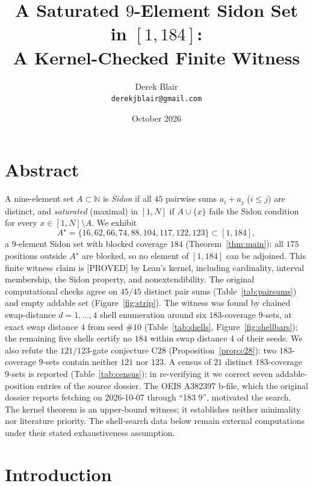 \documentclass[11pt,a4paper]{article}
\title{A Saturated $9$-Element Sidon Set in $[1,184]$:\\
  A Kernel-Checked Finite Witness}
\author{Derek Blair \\ \texttt{derekjblair@gmail.com}}
\date{October 2026}
\theoremstyle{definition}
\begin{document}
\maketitle

\section{Abstract}

A nine-element set $A\subset\mathbb{N}$ is \emph{Sidon} if all $45$ pairwise sums
$a_i+a_j$ ($i\le j$) are distinct, and \emph{saturated} (maximal) in
$[1,N]$ if $A\cup\{x\}$ fails the Sidon condition for every
$x\in[1,N]\setminus A$. We exhibit
\begin{equation}
  \label{eq:witness}
  A^\star=\{16,62,66,74,88,104,117,122,123\}\subset[1,184],
\end{equation}
a $9$-element Sidon set with blocked coverage $184$
(Theorem~\ref{thm:main}): all $175$ positions outside $A^\star$ are
blocked, so no element of $[1,184]$ can be adjoined. This finite witness
claim is [PROVED] by Lean's kernel, including cardinality, interval
membership, the Sidon property, and nonextendibility. The original
computational checks agree on $45/45$ distinct pair sums
(Table~\ref{tab:pairsums}) and empty addable set
(Figure~\ref{fig:strip}). The witness was found by chained
swap-distance $d=1,\dots,4$ shell enumeration around six $183$-coverage
$9$-sets, at exact swap distance $4$ from seed $\#10$
(Table~\ref{tab:shells}, Figure~\ref{fig:shellbars}); the remaining five
shells certify no $184$ within swap distance $4$ of their seeds.
We also refute the $121/123$-gate conjecture C28
(Proposition~\ref{prop:c28}): two $183$-coverage $9$-sets contain neither
$121$ nor $123$. A census of $21$ distinct $183$-coverage $9$-sets is
reported (Table~\ref{tab:census}); in re-verifying it we correct seven
addable-position entries of the source dossier. The OEIS A382397 b-file,
which the original dossier reports fetching on 2026-10-07 through
``183 9'', motivated the search. The kernel theorem is an upper-bound
witness; it establishes neither minimality nor literature priority.
The shell-search data below remain external computations under their
stated exhaustiveness assumption.

\section{Introduction}
\end{document}
